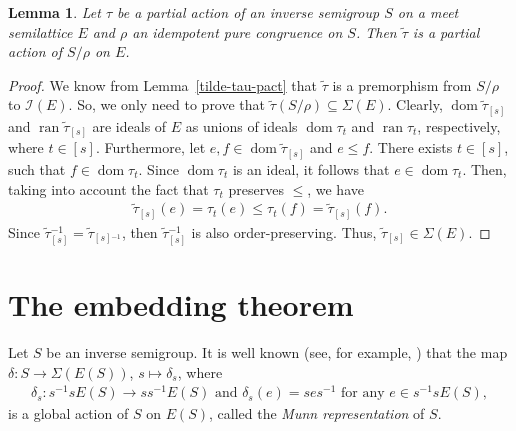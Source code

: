 \documentclass[reqno]{amsart}
\newtheorem{lem}[thrm]{Lemma}
\theoremstyle{definition}
\newcommand{\cI}[1]{\mathcal I{(#1)}}
\newcommand{\Sg}[1]{\Sigma{(#1)}}
\newcommand{\dom}[1]{\operatorname{\mathrm{dom}}{#1}}
\newcommand{\ran}[1]{\operatorname{\mathrm{ran}}{#1}}
\newcommand{\m}{{}^{-1}}
\newcommand{\0}{\theta}
\newcommand{\dt}{\delta}
\newcommand{\tl}{\tilde}
\newcommand{\sst}{\subseteq}
\begin{document}
\begin{lem}\label{L(E-tau-S)-mod-tilde-rho-isom}
	Let $\tau$ be a partial action of an inverse semigroup $S$ on a meet semilattice $E$ and $\rho$ an idempotent pure congruence on $S$. Then $\tl\tau$ is a partial action of $S/\rho$ on $E$.
\end{lem}
\begin{proof}
	We know from Lemma~\ref{tilde-tau-pact} that $\tl\tau$ is a premorphism from $S/\rho$ to $\cI E$. So, we only need to prove that $\tl\tau(S/\rho)\sst\Sg E$. Clearly, $\dom{\tl\tau_{[s]}}$ and $\ran{\tl\tau_{[s]}}$ are ideals of $E$ as unions of ideals $\dom{\tau_t}$ and $\ran{\tau_t}$, respectively, where $t\in[s]$. Furthermore, let $e,f\in\dom{\tl\tau_{[s]}}$ and $e\le f$. There exists $t\in[s]$, such that $f\in\dom{\tau_t}$. Since $\dom{\tau_t}$ is an ideal, it follows that $e\in\dom{\tau_t}$. Then, taking into account the fact that $\tau_t$ preserves $\le$, we have
	\begin{align*}
	\tl\tau_{[s]}(e)=\tau_t(e)\le\tau_t(f)=\tl\tau_{[s]}(f).
	\end{align*}
	Since $\tl\tau\m_{[s]}=\tl\tau_{[s]\m}$, then $\tl\tau\m_{[s]}$ is also order-preserving. Thus, $\tl\tau_{[s]}\in\Sg E$.
\end{proof}

\section{The embedding theorem}

Let $S$ be an inverse semigroup. It is well known (see, for example, \cite[Theorem~5.2.8]{Lawson}) that the map $\dt:S\to\Sg{E(S)}$, $s\mapsto\dt_s$, where
\begin{align}\label{dl_s-defn}
\dt_s:s\m s E(S)\to ss\m E(S)\mbox{ and }\dt_s(e)=ses\m\mbox{ for any }e\in s\m sE(S),
\end{align}
is a global action of $S$ on $E(S)$, called the \emph{Munn representation} of $S$.
\end{document}
